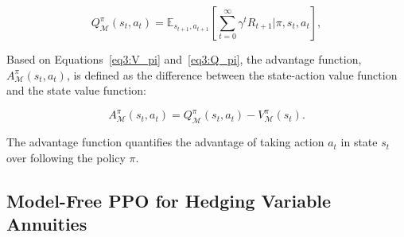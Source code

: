 \begin{equation} \label{eq3:Q_pi}
    Q^{\pi}_{\mathcal{M}}(s_t, a_t) = \mathbb{E}_{s_{t+1}, a_{t+1}} \left[ \sum_{t=0}^{\infty} \gamma^t R_{t+1} |\pi, s_t, a_t \right],
\end{equation}

Based on Equations~\ref{eq3:V_pi} and~\ref{eq3:Q_pi}, the advantage function, $A^{\pi}_{\mathcal{M}}(s_t, a_t)$, is defined as the difference between the state-action value function and the state value function:

\begin{equation} \label{eq3:A_pi}
    A^{\pi}_{\mathcal{M}}(s_t, a_t) = Q^{\pi}_{\mathcal{M}}(s_t, a_t) - V^{\pi}_{\mathcal{M}}(s_t).
\end{equation}

The advantage function quantifies the advantage of taking action $a_t$ in state $s_t$ over following the policy $\pi$.

\subsection{Model-Free PPO for Hedging Variable Annuities}

